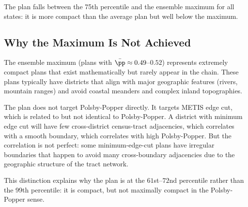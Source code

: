 The \ar{} plan falls between the 75th percentile and the ensemble maximum
for all states: it is more compact than the average \recom{} plan but
well below the maximum.

\subsection{Why the Maximum Is Not Achieved}

The \recom{} ensemble maximum (plans with $\bar\pp \approx 0.49$--$0.52$)
represents extremely compact plans that exist mathematically but rarely appear
in the chain.  These plans typically have districts that align with
major geographic features (rivers, mountain ranges) and avoid coastal
meanders and complex inland topographies.

The \ar{} plan does not target Polsby-Popper directly.  It targets
METIS edge cut, which is related to but not identical to Polsby-Popper.
A district with minimum edge cut will have few cross-district census-tract
adjacencies, which correlates with a smooth boundary, which correlates with
high Polsby-Popper.  But the correlation is not perfect: some minimum-edge-cut
plans have irregular boundaries that happen to avoid many cross-boundary
adjacencies due to the geographic structure of the tract network.

This distinction explains why the \ar{} plan is at the $61$st--$72$nd
percentile rather than the 99th percentile: it is compact, but not
maximally compact in the Polsby-Popper sense.
